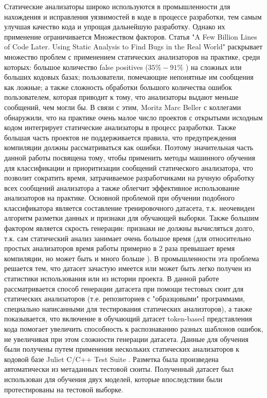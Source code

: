 Статические анализаторы широко используются в промышленности для нахождения и исправления уязвимостей в коде в процессе разработки, тем самым улучшая качество кода и упрощая дальнейшую разработку. Однако их применение ограничивается Множеством факторов. Статья "A Few Billion Lines of Code Later. Using Static Analysis to Find Bugs in the Real World"\cite{Bessey2010AFB} раскрывает множество проблем с применением статических анализаторов на практике, среди которых: большое количество false positives ($35\% - 91\%$ \cite{HECKMAN2011363})  на сложных или больших кодовых базах; пользователи, помечающие непонятные им сообщения как ложные; а также сложность обработки большого количества ошибок пользователем, которая приводит к тому, что анализаторы выдают меньше сообщений, чем могли бы. В связи с этим, Moritz Marc Beller с коллегами \cite{Beller2016AnalyzingTS} обнаружили, что на практике очень малое число проектов с открытыми исходным кодом интегрирует статические анализаторы в процесс разработки. Также большая часть проектов не поддерживается правила, что предупреждения компиляции должны рассматриваться как ошибки.  Поэтому значительная часть данной работы посвящена тому, чтобы применить методы машинного обучения для классификации и приоритизации сообщений статического анализатора, что позволит сократить время, затрачиваемое разработчиками на ручную обработку всех сообщений анализатора а также облегчит эффективное использование анализаторов на практике. Основной проблемой при обучении подобного классификатора является составление тренировочного датасета, т.к. неочевиден алгоритм разметки данных и признаки для обучающей выборки. Также большим фактором является скрость генерации: признаки не должны вычисляться долго, т.к. сам статический анализ занимает очень большое время (для относительно простых анализаторов время работы примерно в 2 раза превышает время компиляции, но может быть и много больше \cite{GCC-SA}). В промышленности эта проблема решается тем, что датасет зачастую имеется\cite{Ruthruff2018PredictingAA} или может быть легко получен из статистики использования или из истории проекта\cite{assesing-validity-of-sa-warnings-cisco}. В данной работе рассматривается способ генерации датасета при помощи тестовых сюит для статических анализаторов\cite{test-suites-for-dataset} (т.е. репозиториев с "образцовыми" программами, специально написанными для тестирования статических анализторов), а также показывается, что включение в обучающий датасет token-based представления кода помогает увеличить способность к распознаванию разных шаблонов ошибок, не увеличивая при этом сложности генерации датасета. Данные для обучения были получены путем применения нескольких статических анализаторов к кодовой базе Juliet C/C++ Test Suite \cite{Juliet}. Разметка была произведена автоматически из метаданных тестовой сюиты. Полученный датасет был использован для обучения двух моделей, которые впоследствии были протестированы на тестовой выборке.

\newpage